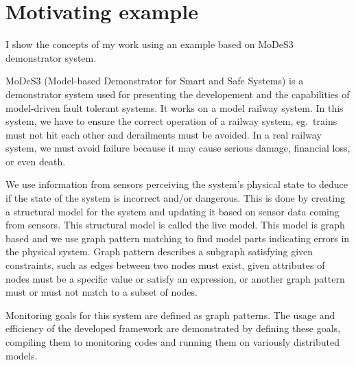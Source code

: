 \chapter{Motivating example}


I show the concepts of my work using an example based on MoDeS3~\cite{modes3} demonstrator system. 

MoDeS3 (Model-based Demonstrator for Smart and Safe Systems) is a demonstrator system used for presenting the developement and the capabilities of model-driven fault tolerant systems.
It works on a model railway system. In this system, we have to ensure the correct operation of a railway system, eg.\ trains must not hit each other and derailments must be avoided. In a real railway system, we must avoid failure because it may cause serious damage, financial loss, or even death.

We use information from sensors perceiving the system's physical state to deduce if the state of the system is incorrect and/or dangerous. This is done by creating a structural model for the system and updating it based on sensor data coming from sensors. This structural model is called the live model. This model is graph based and we use graph pattern matching to find model parts indicating errors in the physical system. Graph pattern describes a subgraph satisfying given constraints, such as edges between two nodes must exist, given attributes of nodes must be a specific value or satisfy an expression, or another graph pattern must or must not match to a subset of nodes.

Monitoring goals for this system are defined as graph patterns. The usage and efficiency of the developed framework are demonstrated by defining these goals, compiling them to monitoring codes and running them on variously distributed models.

 



